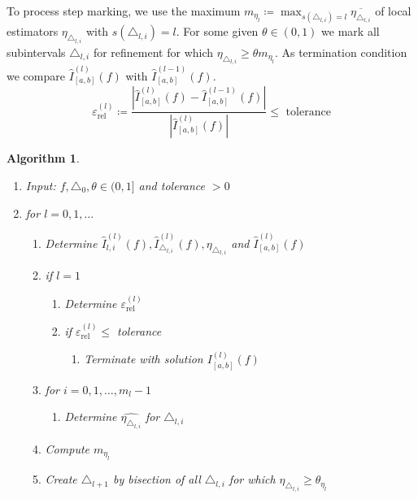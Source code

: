 \documentclass[a4paper]{article}
\numberwithin{lecref}{section}
\theoremstyle{break}
\newtheorem{algorithm}{Algorithm}
\newcommand{\Abs}[1]{\left|#1\right|}
\begin{document}
To process step marking, we use the maximum $m_{\eta_l} \coloneqq \max_{s(\triangle_{l,i})=l} \overline{\eta_{\triangle_{l,i}}}$ of local estimators $\eta_{\triangle_{l,i}}$ with $s(\triangle_{l,i}) = l$. For some given $\theta \in (0,1)$ we mark all subintervals $\triangle_{l,i}$ for refinement for which $\eta_{\triangle_{l,i}} \geq \theta m_{\eta_l}$. As termination condition we compare $\hat I^{(l)}_{[a,b]}(f)$ with $\hat I_{[a,b]}^{(l-1)}(f)$.
\[ \varepsilon_{\text{rel}}^{(l)} \coloneqq \frac{\Abs{\hat I_{[a,b]}^{(l)}(f) - \hat I_{[a,b]}^{(l-1)}(f)}}{\Abs{\hat I_{[a,b]}^{(l)}(f)}} \leq \text{ tolerance} \]

\begin{algorithm}
  \begin{enumerate}
    \item Input: $f, \triangle_0, \theta \in (0,1]$ and tolerance $> 0$
    \item for $l = 0, 1, \dots$
      \begin{enumerate}
        \item Determine $\hat I_{l,i}^{(l)}(f), \hat{I}_{\triangle_{l,i}}^{(l)}(f), \eta_{\triangle_{l,i}}$ and $\hat{I}_{[a,b]}^{(l)}(f)$
        \item if $l = 1$
          \begin{enumerate}
            \item Determine $\varepsilon_{\text{rel}}^{(l)}$
            \item if $\varepsilon_{\text{rel}}^{(l)} \leq$ tolerance
              \begin{enumerate}
                \item Terminate with solution $I_{[a,b]}^{(l)}(f)$
              \end{enumerate}
          \end{enumerate}
        \item for $i = 0, 1, \dots, m_l - 1$
          \begin{enumerate}
            \item Determine $\hat{\eta_{\triangle_{l,i}}}$ for $\triangle_{l,i}$
          \end{enumerate}
        \item Compute $m_{\eta_{l}}$
        \item Create $\triangle_{l+1}$ by bisection of all $\triangle_{l,i}$ for which $\eta_{\triangle_{l,i}} \geq \theta_{\eta_l}$
      \end{enumerate}
  \end{enumerate}
\end{algorithm}
\end{document}
